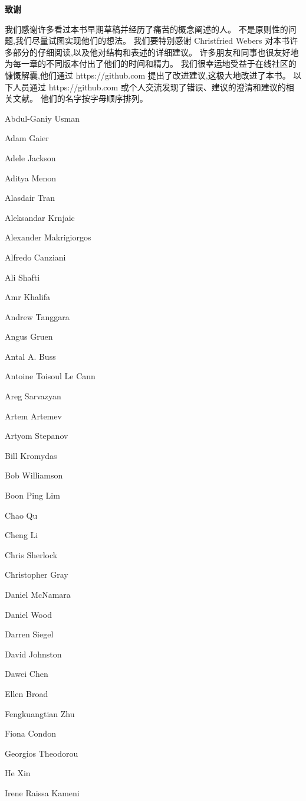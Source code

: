 \begin{center}
	\textbf{致谢}
\end{center}

我们感谢许多看过本书早期草稿并经历了痛苦的概念阐述的人。 不是原则性的问题,我们尽量试图实现他们的想法。
我们要特别感谢 Christfried Webers 对本书许多部分的仔细阅读,以及他对结构和表述的详细建议。
许多朋友和同事也很友好地为每一章的不同版本付出了他们的时间和精力。
我们很幸运地受益于在线社区的慷慨解囊,他们通过 https://github.com 提出了改进建议,这极大地改进了本书。
以下人员通过 https://github.com 或个人交流发现了错误、建议的澄清和建议的相关文献。 他们的名字按字母顺序排列。

Abdul-Ganiy Usman

Adam Gaier

Adele Jackson

Aditya Menon

Alasdair Tran

Aleksandar Krnjaic

Alexander Makrigiorgos

Alfredo Canziani

Ali Shafti

Amr Khalifa

Andrew Tanggara

Angus Gruen

Antal A. Buss

Antoine Toisoul Le Cann

Areg Sarvazyan

Artem Artemev

Artyom Stepanov

Bill Kromydas

Bob Williamson

Boon Ping Lim

Chao Qu

Cheng Li

Chris Sherlock

Christopher Gray

Daniel McNamara

Daniel Wood

Darren Siegel

David Johnston

Dawei Chen

Ellen Broad

Fengkuangtian Zhu

Fiona Condon

Georgios Theodorou

He Xin

Irene Raissa Kameni

